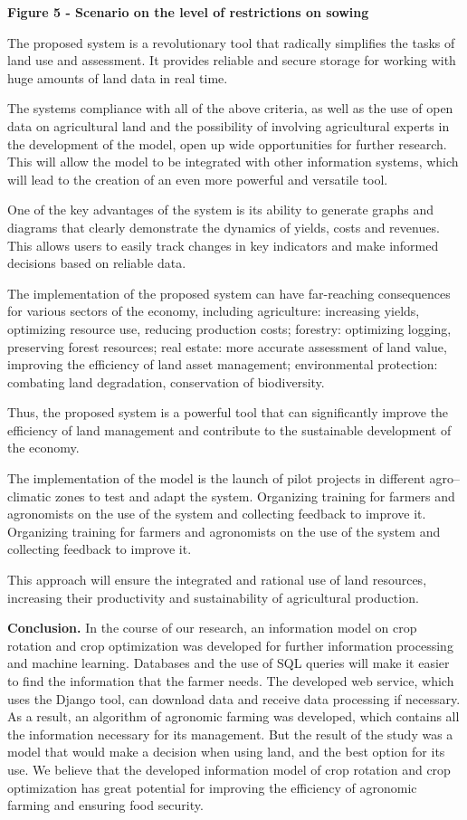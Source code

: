 {\bfseries Figure 5 - Scenario on the level of restrictions on sowing}

The proposed system is a revolutionary tool that radically simplifies
the tasks of land use and assessment. It provides reliable and secure
storage for working with huge amounts of land data in real time.

The system\textquotesingle s compliance with all of the above criteria,
as well as the use of open data on agricultural land and the possibility
of involving agricultural experts in the development of the model, open
up wide opportunities for further research. This will allow the model to
be integrated with other information systems, which will lead to the
creation of an even more powerful and versatile tool.

One of the key advantages of the system is its ability to generate
graphs and diagrams that clearly demonstrate the dynamics of yields,
costs and revenues. This allows users to easily track changes in key
indicators and make informed decisions based on reliable data.

The implementation of the proposed system can have far-reaching
consequences for various sectors of the economy, including agriculture:
increasing yields, optimizing resource use, reducing production costs;
forestry: optimizing logging, preserving forest resources; real estate:
more accurate assessment of land value, improving the efficiency of land
asset management; environmental protection: combating land degradation,
conservation of biodiversity.

Thus, the proposed system is a powerful tool that can significantly
improve the efficiency of land management and contribute to the
sustainable development of the economy.

The implementation of the model is the launch of pilot projects in
different agro--climatic zones to test and adapt the system. Organizing
training for farmers and agronomists on the use of the system and
collecting feedback to improve it. Organizing training for farmers and
agronomists on the use of the system and collecting feedback to improve
it.

This approach will ensure the integrated and rational use of land
resources, increasing their productivity and sustainability of
agricultural production.

{\bfseries Conclusion.} In the course of our research, an information model
on crop rotation and crop optimization was developed for further
information processing and machine learning. Databases and the use of
SQL queries will make it easier to find the information that the farmer
needs. The developed web service, which uses the Django tool, can
download data and receive data processing if necessary. As a result, an
algorithm of agronomic farming was developed, which contains all the
information necessary for its management. But the result of the study
was a model that would make a decision when using land, and the best
option for its use. We believe that the developed information model of
crop rotation and crop optimization has great potential for improving
the efficiency of agronomic farming and ensuring food security.

